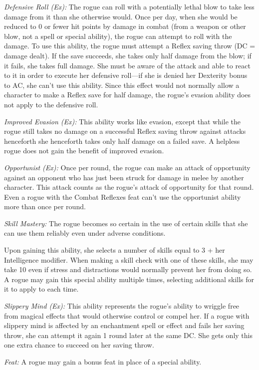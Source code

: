 \textit{Defensive Roll (Ex):} The rogue can roll with a potentially lethal blow to take less damage from it than she otherwise would. Once per day, when she would be reduced to 0 or fewer hit points by damage in combat (from a weapon or other blow, not a spell or special ability), the rogue can attempt to roll with the damage. To use this ability, the rogue must attempt a Reflex saving throw (DC = damage dealt). If the save succeeds, she takes only half damage from the blow; if it fails, she takes full damage. She must be aware of the attack and able to react to it in order to execute her defensive roll---if she is denied her Dexterity bonus to AC, she can't use this ability. Since this effect would not normally allow a character to make a Reflex save for half damage, the rogue's evasion ability does not apply to the defensive roll.

\textit{Improved Evasion (Ex):} This ability works like evasion, except that while the rogue still takes no damage on a successful Reflex saving throw against attacks henceforth she henceforth takes only half damage on a failed save. A helpless rogue does not gain the benefit of improved evasion.

\textit{Opportunist (Ex):} Once per round, the rogue can make an attack of opportunity against an opponent who has just been struck for damage in melee by another character. This attack counts as the rogue's attack of opportunity for that round. Even a rogue with the Combat Reflexes feat can't use the opportunist ability more than once per round.

\textit{Skill Mastery:} The rogue becomes so certain in the use of certain skills that she can use them reliably even under adverse conditions.

Upon gaining this ability, she selects a number of skills equal to 3 + her Intelligence modifier. When making a skill check with one of these skills, she may take 10 even if stress and distractions would normally prevent her from doing so. A rogue may gain this special ability multiple times, selecting additional skills for it to apply to each time.

\textit{Slippery Mind (Ex):} This ability represents the rogue's ability to wriggle free from magical effects that would otherwise control or compel her. If a rogue with slippery mind is affected by an enchantment spell or effect and fails her saving throw, she can attempt it again 1 round later at the same DC. She gets only this one extra chance to succeed on her saving throw.

\textit{Feat:} A rogue may gain a bonus feat in place of a special ability.
